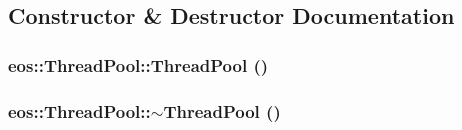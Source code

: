 \subsection{Constructor \& Destructor Documentation}
\hypertarget{classeos_1_1ThreadPool_a0ecd93cf3757d0e087023d42ee30d984}{
\subsubsection[{ThreadPool}]{\setlength{\rightskip}{0pt plus 5cm}eos::ThreadPool::ThreadPool ()}}
\label{classeos_1_1ThreadPool_a0ecd93cf3757d0e087023d42ee30d984}
\hypertarget{classeos_1_1ThreadPool_af8929a7e28f8e3d7539a10c026c2588d}{
\subsubsection[{$\sim$ThreadPool}]{\setlength{\rightskip}{0pt plus 5cm}eos::ThreadPool::$\sim$ThreadPool ()}}
\label{classeos_1_1ThreadPool_af8929a7e28f8e3d7539a10c026c2588d}


